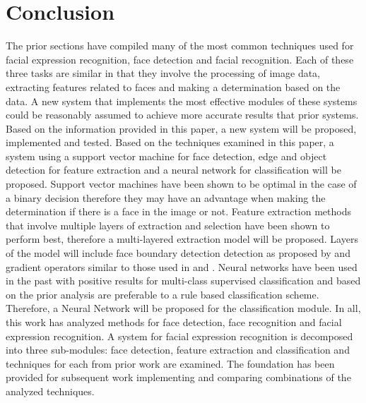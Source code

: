 \documentclass{IEEEtran}
\begin{document}
\section{Conclusion}
The prior sections have compiled many of the most common techniques used for facial expression recognition, face detection and facial recognition. Each of these three tasks are similar in that they involve the processing of image data, extracting features related to faces and making a determination based on the data. A new system that implements the most effective modules of these systems could be reasonably assumed to achieve more accurate results that prior systems. Based on the information provided in this paper, a new system will be proposed, implemented and tested. Based on the techniques examined in this paper, a system using a support vector machine for face detection, edge and object detection for feature extraction and a neural network for classification will be proposed. 
Support vector machines have been shown to be optimal in the case of a binary decision therefore they may have an advantage when making the determination if there is a face in the image or not. Feature extraction methods that involve multiple layers of extraction and selection have been shown to perform best, therefore a multi-layered extraction model will be proposed. Layers of the model will include face boundary detection detection as proposed by \cite{viola2004robust} and gradient operators similar to those used in \cite{lei2006combination} and \cite{alazzawi2018performance}. Neural networks have been used in the past with positive results for multi-class supervised classification and based on the prior analysis are preferable to a rule based classification scheme. Therefore, a Neural Network will be proposed for the classification module.
In all, this work has analyzed methods for face detection, face recognition and facial expression recognition. A system for facial expression recognition is decomposed into three sub-modules: face detection, feature extraction and classification and techniques for each from prior work are examined. The foundation has been provided for subsequent work implementing and comparing combinations of the analyzed techniques.

\newpage


\end{document}
